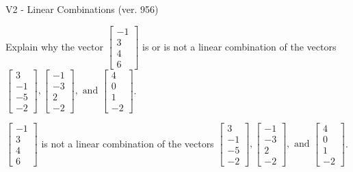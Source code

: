 \begin{exercise}
  \begin{exerciseTitle}V2 - Linear Combinations (ver. 956)\end{exerciseTitle}
  \begin{exerciseStatement}
    Explain why the vector \(\left[\begin{array}{c}
-1 \\
3 \\
4 \\
6
\end{array}\right]\)  is or is not a linear 
	combination of the vectors \(\left[\begin{array}{c}
3 \\
-1 \\
-5 \\
-2
\end{array}\right] , \left[\begin{array}{c}
-1 \\
-3 \\
2 \\
-2
\end{array}\right] , \text{ and } \left[\begin{array}{c}
4 \\
0 \\
1 \\
-2
\end{array}\right]\).
	


  \end{exerciseStatement}
  \begin{exerciseAnswer}
   \(\left[\begin{array}{c}
-1 \\
3 \\
4 \\
6
\end{array}\right]\) 
  	 is not  
	a linear combination of the vectors \(\left[\begin{array}{c}
3 \\
-1 \\
-5 \\
-2
\end{array}\right] , \left[\begin{array}{c}
-1 \\
-3 \\
2 \\
-2
\end{array}\right] , \text{ and } \left[\begin{array}{c}
4 \\
0 \\
1 \\
-2
\end{array}\right]\).

	
  


  \end{exerciseAnswer}
\end{exercise}